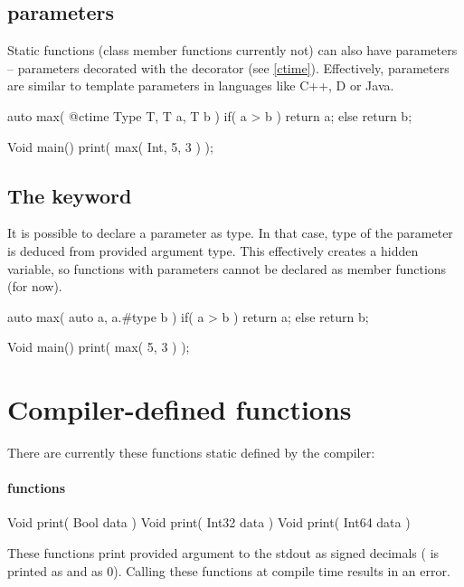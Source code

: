 \subsection{\ctime parameters}
Static functions (class member functions currently not) can also have \ctime parameters -- parameters decorated with the  decorator (see \autoref{ctime}). Effectively, \ctime parameters are similar to template parameters in languages like C++, D or Java.

\begin{code}
auto max( @ctime Type T, T a, T b ) {
	if( a > b )
		return a;
	else
		return b;
}
	
Void main() {
	print( max( Int, 5, 3 ) );
}
\end{code}

\subsection{The  keyword}
It is possible to declare a parameter as  type. In that case, type of the parameter is deduced from provided argument type. This effectively creates a hidden  variable, so functions with  parameters cannot be declared as member functions (for now).

\begin{code}
auto max( auto a, a.#type b ) {
	if( a > b )
		return a;
	else
		return b;
}

Void main() {
	print( max( 5, 3 ) );
}
\end{code}

\section{Compiler-defined functions}
There are currently these functions static defined by the compiler:

\paragraph{ functions}

\begin{code}
Void print( Bool data )
Void print( Int32 data )
Void print( Int64 data )
\end{code}
These functions print provided argument to the stdout as signed decimals ( is printed as  and  as 0). Calling these functions at compile time results in an error.

